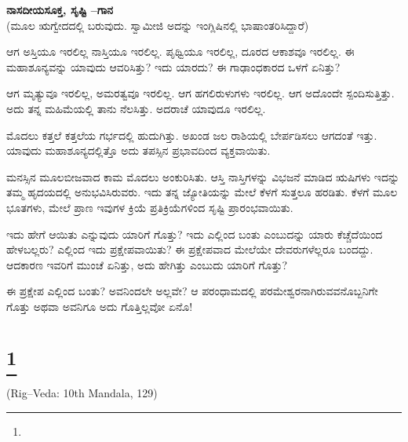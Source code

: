 \begin{myquote}
\end{myquote}

\selectkan

\begin{center}
\textbf{ನಾಸದೀಯಸೂಕ್ತ, ಸೃಷ್ಟಿ –ಗಾನ}\\(ಮೂಲ ಋಗ್ವೇದದಲ್ಲಿ ಬರುವುದು. ಸ್ವಾಮೀಜಿ ಅದನ್ನು ಇಂಗ್ಲಿಷಿನಲ್ಲಿ ಭಾಷಾಂತರಿಸಿದ್ದಾರೆ)
\end{center}

ಆಗ ಅಸ್ತಿಯೂ ಇರಲಿಲ್ಲ ನಾಸ್ತಿಯೂ ಇರಲಿಲ್ಲ. ಪೃಥ್ವಿಯೂ ಇರಲಿಲ್ಲ, ದೂರದ ಆಕಾಶವೂ ಇರಲಿಲ್ಲ. ಈ ಮಹಾಶೂನ್ಯವನ್ನು ಯಾವುದು ಆವರಿಸಿತ್ತು? ಇದು ಯಾರದು? ಈ ಗಾಢಾಂಧಕಾರದ ಒಳಗೆ ಏನಿತ್ತು?

ಆಗ ಮೃತ್ಯುವೂ ಇರಲಿಲ್ಲ, ಅಮರತ್ವವೂ ಇರಲಿಲ್ಲ. ಆಗ ಹಗಲಿರುಳುಗಳು ಇರಲಿಲ್ಲ. ಆಗ ಅದೊಂದೇ ಸ್ಪಂದಿಸುತ್ತಿತ್ತು. ಅದು ತನ್ನ ಮಹಿಮೆಯಲ್ಲಿ ತಾನು ನೆಲಸಿತ್ತು. ಅದರಾಚೆ ಯಾವುದೂ ಇರಲಿಲ್ಲ.

ಮೊದಲು ಕತ್ತಲೆ ಕತ್ತಲೆಯ ಗರ್ಭದಲ್ಲಿ ಹುದುಗಿತ್ತು. ಅಖಂಡ ಜಲ ರಾಶಿಯಲ್ಲಿ ಬೇರ್ಪಡಿಸಲು ಆಗದಂತೆ ಇತ್ತು. ಯಾವುದು ಮಹಾಶೂನ್ಯದಲ್ಲಿತ್ತೊ ಅದು ತಪಸ್ಸಿನ ಪ್ರಭಾವದಿಂದ ವ್ಯಕ್ತವಾಯಿತು.

ಮನಸ್ಸಿನ ಮೂಲಬೀಜವಾದ ಕಾಮ ಮೊದಲು ಅಂಕುರಿಸಿತು. ಆಸ್ತಿ ನಾಸ್ತಿಗಳನ್ನು ವಿಭಜನೆ ಮಾಡಿದ ಋಷಿಗಳು ಇದನ್ನು ತಮ್ಮ ಹೃದಯದಲ್ಲಿ ಅನುಭವಿಸಿರುವರು. ಇದು ತನ್ನ ಜ್ಯೋತಿಯನ್ನು ಮೇಲೆ ಕೆಳಗೆ ಸುತ್ತಲೂ ಹರಡಿತು. ಕೆಳಗೆ ಮೂಲ ಭೂತಗಳು, ಮೇಲೆ ಪ್ರಾಣ ಇವುಗಳ ಕ್ರಿಯೆ ಪ್ರತಿಕ್ರಿಯೆಗಳಿಂದ ಸೃಷ್ಟಿ ಪ್ರಾರಂಭವಾಯಿತು.

ಇದು ಹೇಗೆ ಆಯಿತು ಎನ್ನುವುದು ಯಾರಿಗೆ ಗೊತ್ತು? ಇದು ಎಲ್ಲಿಂದ ಬಂತು ಎಂಬುದನ್ನು ಯಾರು ಕೆಚ್ಚೆದೆಯಿಂದ ಹೇಳಬಲ್ಲರು? ಎಲ್ಲಿಂದ ಇದು ಪ್ರಕ್ಷೇಪವಾಯಿತು? ಈ ಪ್ರಕ್ಷೇಪವಾದ ಮೇಲೆಯೇ ದೇವರುಗಳೆಲ್ಲರೂ ಬಂದದ್ದು. ಆದಕಾರಣ ಇವರಿಗೆ ಮುಂಚೆ ಏನಿತ್ತು, ಅದು ಹೇಗಿತ್ತು ಎಂಬುದು ಯಾರಿಗೆ ಗೊತ್ತು?

ಈ ಪ್ರಕ್ಷೇಪ ಎಲ್ಲಿಂದ ಬಂತು? ಅವನಿಂದಲೇ ಅಲ್ಲವೇ? ಆ ಪರಂಧಾಮದಲ್ಲಿ ಪರಮೇಶ್ವರನಾಗಿರುವವನೊಬ್ಬನಿಗೇ ಗೊತ್ತು ಅಥವಾ ಅವನಿಗೂ ಅದು ಗೊತ್ತಿಲ್ಲವೋ ಏನೊ!

\selecteng

\chapter[THY LOVE I FEAR]{\protect\footnote{}}

\begin{center}
(Rig–Veda: 10th Mandala, 129)
\end{center}

